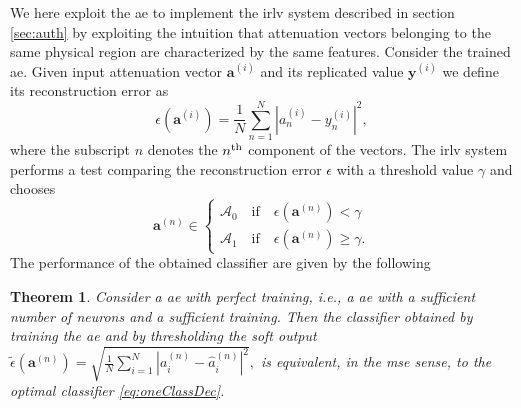\documentclass[draftcls,onecolumn,12pt]{IEEEtran}
\newtheorem{theorem}{Theorem}
\begin{document}
We here exploit the \ac{ae} to implement the \ac{irlv} system described in section \ref{sec:auth} by exploiting the intuition that attenuation vectors belonging to the same physical region are characterized by the same features. Consider the trained \ac{ae}. Given input attenuation vector $\bm{a}^{(i)}$ and its replicated value $\bm{y}^{(i)}$ we define its reconstruction error as
\begin{equation}\label{eq: rec err}
    \epsilon(\bm{a}^{(i)}) = \frac{1}{N}\sum_{n=1}^{N}|a^{(i)}_n-y^{(i)}_n|^2,
\end{equation}
where the subscript $n$ denotes the $n^{\rm th}$ component of the vectors. The \ac{irlv} system performs a test comparing the reconstruction error $\epsilon$ with a threshold value $\gamma$ and chooses 
\begin{equation}
\bm{a}^{(n)} \in
\begin{cases}
\mathcal{A}_0 \quad \text{if} \quad \epsilon(\bm{a}^{(n)}) < \gamma \\
\mathcal{A}_1 \quad \text{if} \quad \epsilon(\bm{a}^{(n)}) \ge \gamma. 
\end{cases}
\end{equation}
The performance of the obtained classifier are given by the following 
\begin{theorem}
    Consider a \ac{ae} with perfect training, i.e., a \ac{ae} with a sufficient number of neurons and a sufficient training. Then the classifier obtained by training the \ac{ae} and by thresholding the soft output $\tilde{\epsilon}(\bm{a}^{(n)}) = \sqrt{\frac{1}{N}\sum_{i=1}^{N}|a^{(n)}_i-\hat{a}^{(n)}_i|^2},$ is equivalent, in the \ac{mse} sense, to the optimal classifier \eqref{eq:oneClassDec}.
\end{theorem}
\end{document}
